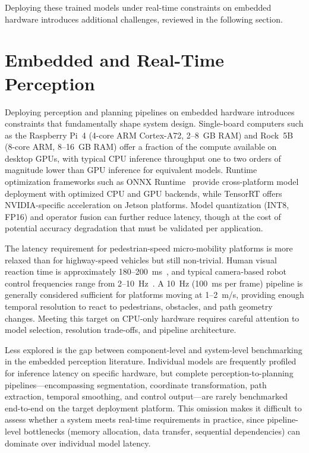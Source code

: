 \documentclass[12pt,letterpaper,oneside]{report}
\begin{document}
Deploying these trained models under real-time constraints on embedded hardware introduces additional challenges, reviewed in the following section.


\section{Embedded and Real-Time Perception}
\label{sec:lit_embedded}

Deploying perception and planning pipelines on embedded hardware introduces constraints that fundamentally shape system design. Single-board computers such as the Raspberry Pi~4 (4-core ARM Cortex-A72, 2--8~GB RAM) and Rock~5B (8-core ARM, 8--16~GB RAM) offer a fraction of the compute available on desktop GPUs, with typical CPU inference throughput one to two orders of magnitude lower than GPU inference for equivalent models. Runtime optimization frameworks such as ONNX Runtime~\cite{onnxruntime} provide cross-platform model deployment with optimized CPU and GPU backends, while TensorRT offers NVIDIA-specific acceleration on Jetson platforms. Model quantization (INT8, FP16) and operator fusion can further reduce latency, though at the cost of potential accuracy degradation that must be validated per application.

The latency requirement for pedestrian-speed micro-mobility platforms is more relaxed than for highway-speed vehicles but still non-trivial. Human visual reaction time is approximately 180--200~ms~\cite{kosinski2008reaction}, and typical camera-based robot control frequencies range from 2--10~Hz~\cite{pi0_lowfreq}. A 10~Hz (100~ms per frame) pipeline is generally considered sufficient for platforms moving at 1--2~m/s, providing enough temporal resolution to react to pedestrians, obstacles, and path geometry changes. Meeting this target on CPU-only hardware requires careful attention to model selection, resolution trade-offs, and pipeline architecture.

Less explored is the gap between component-level and system-level benchmarking in the embedded perception literature. Individual models are frequently profiled for inference latency on specific hardware, but complete perception-to-planning pipelines---encompassing segmentation, coordinate transformation, path extraction, temporal smoothing, and control output---are rarely benchmarked end-to-end on the target deployment platform. This omission makes it difficult to assess whether a system meets real-time requirements in practice, since pipeline-level bottlenecks (memory allocation, data transfer, sequential dependencies) can dominate over individual model latency.
\end{document}

